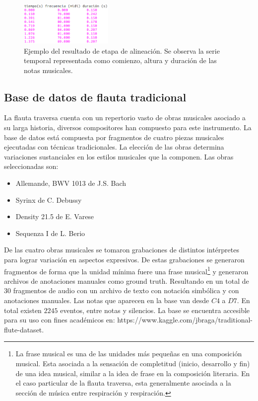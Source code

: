 \documentclass
  [ams,pdfout]%
	{aeslac}
\begin{document}
\begin{figure}[h!]
\begin{center}
\includegraphics[width=0.4\textwidth]{imagenes/datos} 	
\caption{Ejemplo del resultado de etapa de alineación. Se observa la serie temporal representada como comienzo, altura y duración de las notas musicales.}
\label{fig:datos_tabla}
\end{center}
\end{figure}

\subsection{Base de datos de flauta tradicional}

La flauta traversa cuenta con un repertorio vasto de obras musicales asociado a su larga historia,  diversos compositores han compuesto para este instrumento. La base de datos está compuesta por fragmentos de cuatro piezas musicales ejecutadas con técnicas tradicionales. La elección de las obras determina variaciones sustanciales en los estilos musicales que la componen. Las obras seleccionadas son:
\begin{itemize}
\item Allemande, BWV 1013 de J.S. Bach
\item Syrinx de C. Debussy
\item Density 21.5 de E. Varese
\item Sequenza I de L. Berio
\end{itemize} 

%
De las cuatro obras musicales se tomaron grabaciones de distintos intérpretes para lograr variación en aspectos expresivos. De estas grabaciones se generaron fragmentos de forma que la unidad mínima fuere una frase musical\footnote{La frase musical es una de las unidades más pequeñas en una composición musical. Esta asociada a la sensación de completitud (inicio, desarrollo y fin) de una idea musical, similar a la idea de frase en la composición literaria. En el caso particular de la flauta traversa, esta generalmente asociada a la sección de música entre respiración y respiración\cite{blom1955grove}.} y generaron archivos de anotaciones manuales como ground truth. Resultando en un total de 30 fragmentos de audio con un archivo de texto con notación simbólica y con anotaciones manuales. Las notas que aparecen en la base van desde $C4$ a $D7$. En total existen $2245$ eventos, entre notas y silencios. La base se encuentra accesible para su uso con fines académicos en: https://www.kaggle.com/jbraga/traditional-flute-dataset.
\end{document}
